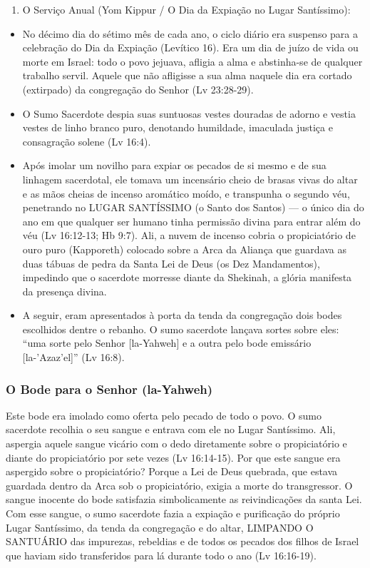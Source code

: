 \documentclass[11pt,a4paper,openany]{book}
\begin{document}
\begin{enumerate}
  \item O Serviço Anual (Yom Kippur / O Dia da Expiação no Lugar Santíssimo):
\end{enumerate}

\begin{itemize}
  \item No décimo dia do sétimo mês de cada ano, o ciclo diário era suspenso para a celebração do Dia da Expiação (Levítico 16). Era um dia de juízo de vida ou morte em Israel: todo o povo jejuava, afligia a alma e abstinha-se de qualquer trabalho servil. Aquele que não afligisse a sua alma naquele dia era cortado (extirpado) da congregação do Senhor (Lv 23:28-29).
  \item O Sumo Sacerdote despia suas suntuosas vestes douradas de adorno e vestia vestes de linho branco puro, denotando humildade, imaculada justiça e consagração solene (Lv 16:4).
  \item Após imolar um novilho para expiar os pecados de si mesmo e de sua linhagem sacerdotal, ele tomava um incensário cheio de brasas vivas do altar e as mãos cheias de incenso aromático moído, e transpunha o segundo véu, penetrando no LUGAR SANTÍSSIMO (o Santo dos Santos) — o único dia do ano em que qualquer ser humano tinha permissão divina para entrar além do véu (Lv 16:12-13; Hb 9:7). Ali, a nuvem de incenso cobria o propiciatório de ouro puro (Kapporeth) colocado sobre a Arca da Aliança que guardava as duas tábuas de pedra da Santa Lei de Deus (os Dez Mandamentos), impedindo que o sacerdote morresse diante da Shekinah, a glória manifesta da presença divina.
  \item A seguir, eram apresentados à porta da tenda da congregação dois bodes escolhidos dentre o rebanho. O sumo sacerdote lançava sortes sobre eles: ``uma sorte pelo Senhor [la-Yahweh] e a outra pelo bode emissário [la-'Azaz'el]'' (Lv 16:8).
\end{itemize}


\subsubsection*{O Bode para o Senhor (la-Yahweh)}
Este bode era imolado como oferta pelo pecado de todo o povo. O sumo sacerdote recolhia o seu sangue e entrava com ele no Lugar Santíssimo. Ali, aspergia aquele sangue vicário com o dedo diretamente sobre o propiciatório e diante do propiciatório por sete vezes (Lv 16:14-15). Por que este sangue era aspergido sobre o propiciatório? Porque a Lei de Deus quebrada, que estava guardada dentro da Arca sob o propiciatório, exigia a morte do transgressor. O sangue inocente do bode satisfazia simbolicamente as reivindicações da santa Lei. Com esse sangue, o sumo sacerdote fazia a expiação e purificação do próprio Lugar Santíssimo, da tenda da congregação e do altar, LIMPANDO O SANTUÁRIO das impurezas, rebeldias e de todos os pecados dos filhos de Israel que haviam sido transferidos para lá durante todo o ano (Lv 16:16-19).
\end{document}
